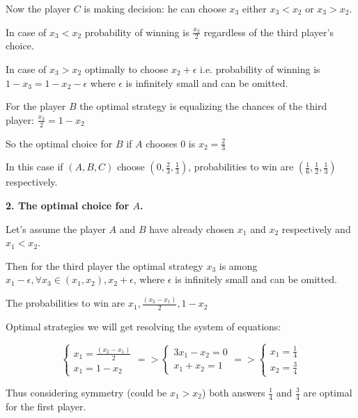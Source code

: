 \documentclass[12pt]{article}
\begin{document}
Now the player $C$ is making decision: he can choose $x_3$ either 
$x_3 < x_2$ or $x_3 > x_2$.

In case of $x_3 < x_2$ probability of winning is $\frac{x_2}{2}$ 
regardless of the third player's choice.

In case of $x_3 > x_2$ optimally to choose $x_2 + \epsilon$ i.e. 
probability of winning is $1 - x_3 = 1 - x_2 - \epsilon$ where $\epsilon$ 
is infinitely small and can be omitted.

For the player $B$ the optimal strategy is equalizing 
the chances of the third player: $\frac{x_2}{2} = 1 - x_2$

So the optimal choice for $B$ if $A$ chooses $0$ is 
{\boldmath$x_2 = \frac{2}{3}$}

In this case if $(A, B, C)$ choose $(0, \frac{2}{3}, \frac{1}{3})$, 
probabilities to win are $(\frac{1}{6}, \frac{1}{2}, \frac{1}{3})$ respectively.

\bigskip

\textbf{2. The optimal choice for $A$.}

Let's assume the player $A$ and $B$ have already chosen $x_1$ and $x_2$ 
respectively and $x_1 < x_2$.

Then for the third player the optimal strategy $x_3$ is among \newline
$x_1 - \epsilon, \forall x_3 \in (x_1, x_2), x_2 + \epsilon$, 
where $\epsilon$ is infinitely small and can be omitted.

The probabilities to win are $x_1, \frac{(x_2 - x_1)}{2}, 1 - x_2$

Optimal strategies we will get resolving the system of equations:

\bigskip

$$\begin{cases} 
x_1 = \frac{(x_2 - x_1)}{2} \\ 
x_1 = 1 - x_2 
\end{cases} 
=>
\begin{cases} 
3x_1 - x_2 = 0 \\ 
x_1 + x_2 = 1 
\end{cases}
=>
\begin{cases} 
x_1 = \frac{1}{4} \\ 
x_2 = \frac{3}{4} 
\end{cases}$$

\bigskip

Thus considering symmetry (could be $x_1 > x_2$) both answers 
{\boldmath$\frac{1}{4}$} and {\boldmath$\frac{3}{4}$} are optimal 
for the first player.
\end{document}
